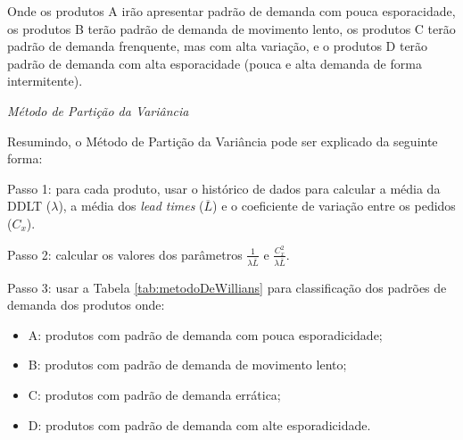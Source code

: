\documentclass{book}
\begin{document}
Onde os produtos A irão apresentar padrão de demanda com pouca esporacidade, os produtos B terão padrão de demanda de movimento lento, os produtos C terão padrão de demanda frenquente, mas com alta variação, e o produtos D terão padrão de demanda com alta esporacidade (pouca e alta demanda de forma intermitente).

\emph{Método de Partição da Variância}

Resumindo, o Método de Partição da Variância pode ser explicado da seguinte forma:

Passo 1: para cada produto, usar o histórico de dados para calcular a média da DDLT ($\lambda$), a média dos \emph{lead times} ($\overline{L}$) e o coeficiente de variação entre os pedidos ($C_x$).

Passo 2: calcular os valores dos parâmetros $\frac{1}{\lambda \overline{L}}$ e $\frac{C_x^2}{\lambda \overline{L}}$.

Passo 3: usar a Tabela \ref{tab:metodoDeWillians} para classificação dos padrões de demanda dos produtos onde:

\begin{itemize}
\item A: produtos com padrão de demanda com pouca esporadicidade;
\item B: produtos com padrão de demanda de movimento lento;
\item C: produtos com padrão de demanda errática;
\item D: produtos com padrão de demanda com alte esporadicidade.
\end{itemize}
\end{document}
